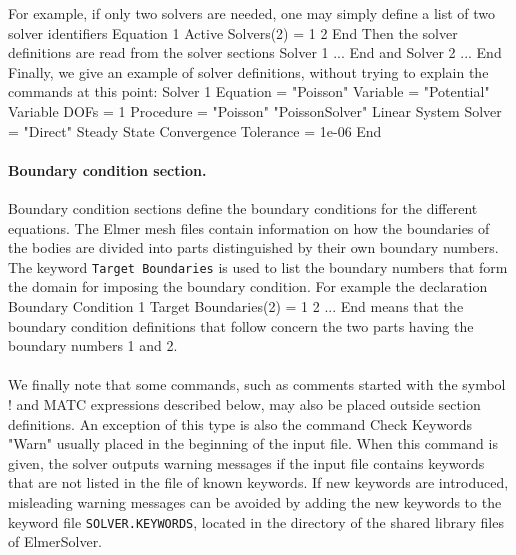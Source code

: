 For example, if only two solvers are needed, one may simply define a list of two solver identifiers 
\ttbegin
Equation 1
  Active Solvers(2) = 1 2
End
\ttend
Then the solver definitions are read from the solver sections 
\ttbegin
Solver 1
  ...
End
\ttend
and 
\ttbegin
Solver 2
  ...
End
\ttend
Finally, we give an example of solver definitions, without trying to explain the commands at this point:
\ttbegin
Solver 1
  Equation = "Poisson"
  Variable = "Potential"
  Variable DOFs = 1
  Procedure = "Poisson" "PoissonSolver"
  Linear System Solver = "Direct"
  Steady State Convergence Tolerance = 1e-06
End
\ttend

\paragraph{Boundary condition section.}Boundary condition sections define the boundary conditions for the different
equations. The Elmer mesh files contain information on how the boundaries of the bodies are divided
into parts distinguished by their own boundary numbers. The keyword {\tt Target Boundaries} is used to list 
the boundary numbers that form the domain for imposing the boundary condition. 
For example the declaration 
\ttbegin
Boundary  Condition 1
  Target Boundaries(2) = 1 2
  ...
End
\ttend
means that the boundary condition definitions that follow concern the two parts having the boundary numbers 1 and 2.

\paragraph{}
We finally note that some commands, such as comments started with the symbol ! and MATC expressions described below, 
may also be placed outside section definitions. An exception of this type is also the command
\ttbegin
Check Keywords "Warn"
\ttend
usually placed in the beginning of the input file. When this command is given, the solver 
outputs warning messages if the input file contains keywords that are not listed in the file
of known keywords. If new keywords are introduced, misleading warning messages can be avoided
by adding the new keywords to the keyword file {\tt SOLVER.KEYWORDS}, located in the directory
of the shared library files of ElmerSolver. 
 
